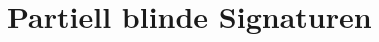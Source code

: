 \documentclass[
	fontsize=11pt,
	headings=small,
	parskip=half,           %
	bibliography=totoc,
	numbers=noenddot,       %
	open=any,               %
]{scrreprt}
\begin{document}


\section{Partiell blinde Signaturen}
\label{sec:partBlindSig}
\end{document}
